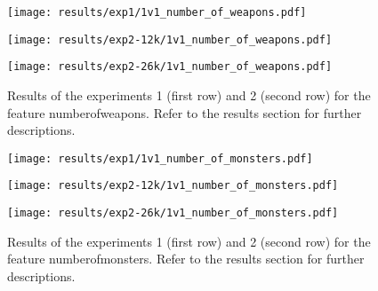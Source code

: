\begin{figure}[h!]
    \centering
	\begin{minipage}{0.3\linewidth}
		\texttt{[image: results/exp1/1v1\_number\_of\_weapons.pdf]}
	\end{minipage}

	\begin{minipage}{0.3\linewidth}
		\texttt{[image: results/exp2-12k/1v1\_number\_of\_weapons.pdf]}
	\end{minipage}
	\begin{minipage}{0.3\linewidth}
		\texttt{[image: results/exp2-26k/1v1\_number\_of\_weapons.pdf]}
	\end{minipage}

	\caption[ Results: Feature number\textunderscore of\textunderscore weapons]{ Results of the experiments 1 (first row) and 2 (second row) for the feature number\textunderscore of\textunderscore weapons. Refer to the results section for further descriptions. }
	\label{fig:appendix_number_of_weapons}
\end{figure}
 \newpage 

 
\begin{figure}[h!]
    \centering
	\begin{minipage}{0.3\linewidth}
		\texttt{[image: results/exp1/1v1\_number\_of\_monsters.pdf]}
	\end{minipage}

	\begin{minipage}{0.3\linewidth}
		\texttt{[image: results/exp2-12k/1v1\_number\_of\_monsters.pdf]}
	\end{minipage}
	\begin{minipage}{0.3\linewidth}
		\texttt{[image: results/exp2-26k/1v1\_number\_of\_monsters.pdf]}
	\end{minipage}

	\caption[ Results: Feature number\textunderscore of\textunderscore monsters]{ Results of the experiments 1 (first row) and 2 (second row) for the feature number\textunderscore of\textunderscore monsters. Refer to the results section for further descriptions. }
	\label{fig:appendix_number_of_monsters}
\end{figure}
 
